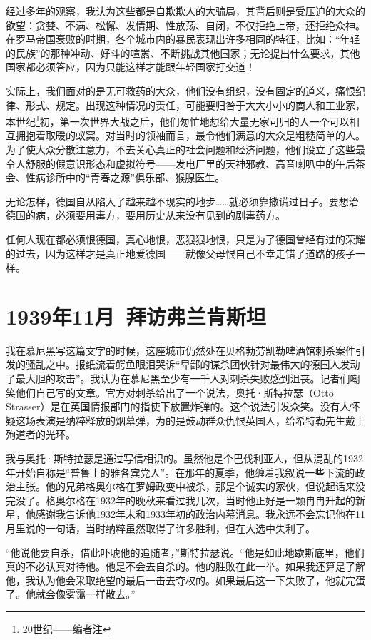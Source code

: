 \documentclass[UTF8]{ctexart}
\begin{document}
经过多年的观察，我认为这些都是自欺欺人的大骗局，其背后则是受压迫的大众的欲望：贪婪、不满、松懈、发情期、性放荡、自闭，不仅拒绝上帝，还拒绝众神。在罗马帝国衰败的时期，各个城市内的暴民表现出许多相同的特征，比如：“年轻的民族”的那种冲动、好斗的喧嚣、不断挑战其他国家；无论提出什么要求，其他国家都必须答应，因为只能这样才能跟年轻国家打交道！

实际上，我们面对的是无可救药的大众，他们没有组织，没有固定的道义，痛恨纪律、形式、规定。出现这种情况的责任，可能要归咎于大大小小的商人和工业家，本世纪\footnote{20世纪——编者注}初，第一次世界大战之后，他们匆忙地想给大量无家可归的人一个可以相互拥抱着取暖的蚁窝。对当时的领袖而言，最令他们满意的大众是粗糙简单的人。为了使大众分散注意力，不去关心真正的社会问题和经济问题，他们设立了这些最令人舒服的假意识形态和虚拟符号——发电厂里的天神邪教、高音喇叭中的午后茶会、性病诊所中的“青春之源”俱乐部、猴腺医生。

无论怎样，德国自从陷入了越来越不现实的地步……就必须靠撒谎过日子。要想治德国的病，必须要用毒方，要用历史从来没有见到的剧毒药方。

任何人现在都必须恨德国，真心地恨，恶狠狠地恨，只是为了德国曾经有过的荣耀的过去，因为这样才是真正地爱德国——就像父母恨自己不幸走错了道路的孩子一样。

\section{1939年11月\ 拜访弗兰肯斯坦}

我在慕尼黑写这篇文字的时候，这座城市仍然处在贝格勃劳凯勒啤酒馆刺杀案件引发的骚乱之中。报纸流着鳄鱼眼泪哭诉“卑鄙的谋杀团伙针对最伟大的德国人发动了最大胆的攻击”。我认为在慕尼黑至少有一千人对刺杀失败感到沮丧。记者们嘲笑他们自己写的文章。官方对刺杀给出了一个说法，奥托·斯特拉瑟（Otto Strasser）是在英国情报部门的指使下放置炸弹的。这个说法引发众笑。没有人怀疑这场表演是纳粹释放的烟幕弹，为的是鼓动群众仇恨英国人，给希特勒先生戴上殉道者的光环。

我与奥托·斯特拉瑟是通过写信相识的。虽然他是个巴伐利亚人，但从混乱的1932年开始自称是“普鲁士的雅各宾党人”。在那年的夏季，他缠着我叙说一些下流的政治主张。他的兄弟格奥尔格在罗姆政变中被杀，那是个诚实的家伙，但说起话来没完没了。格奥尔格在1932年的晚秋来看过我几次，当时他正好是一颗冉冉升起的新星，他感谢我告诉他1932年末和1933年初的政治内幕消息。我永远不会忘记他在11月里说的一句话，当时纳粹虽然取得了许多胜利，但在大选中失利了。

“他说他要自杀，借此吓唬他的追随者，”斯特拉瑟说。“他是如此地歇斯底里，他们真的不必认真对待他。他是不会去自杀的。他的胜败在此一举。如果我还算是了解他，我认为他会采取绝望的最后一击去夺权的。如果最后这一下失败了，他就完蛋了。他就会像雾霭一样散去。”
\end{document}
